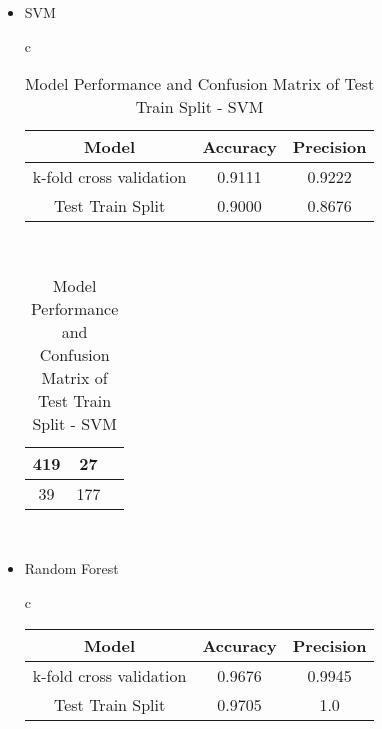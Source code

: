 \documentclass{article}
\begin{document}
\begin{itemize}
\begin{itemize}
\begin{itemize}
\begin{itemize}
        \item SVM
            \begin{table}[htbp]
            \centering
            \begin{tabular}{c} %
                \begin{tabular}{|c|c|c|}
                \hline
                Model & Accuracy & Precision \\
                \hline
                k-fold cross validation & 0.9111 &  0.9222 \\
                \hline
                Test Train Split & 0.9000 & 0.8676 \\
                \hline
                \end{tabular}
                \vspace{5mm} \\ %
                
                \begin{tabular}{|c|c|c|}
                \hline
                419  & 27 \\
                \hline
                39 & 177 \\
                \hline
                \end{tabular} \\
            \end{tabular}
            \caption{Model Performance and Confusion Matrix of Test Train Split - SVM}
            \label{tab:combined_table}
            \end{table}

        \item Random Forest
            \begin{table}[htbp]
            \centering
            \begin{tabular}{c} %
                \begin{tabular}{|c|c|c|}
                \hline
                Model & Accuracy & Precision \\
                \hline
                k-fold cross validation & 0.9676 & 0.9945 \\
                \hline
                Test Train Split & 0.9705 & 1.0 \\
                \hline
                \end{tabular}
                \vspace{5mm} \\ %


\end{tabular}
\end{table}
\end{itemize}
\end{itemize}
\end{itemize}
\end{itemize}
\end{document}
